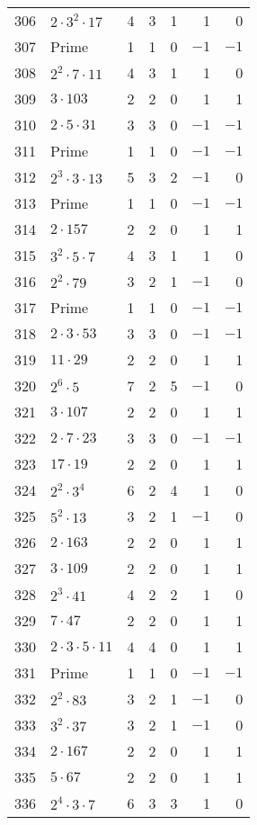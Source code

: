 \documentclass[12pt]{article}
\begin{document}
\begin{tabular}{|r|l|r|r|r|r|r|}
306 & $2 \cdot 3^2 \cdot 17$ & 4 & 3 & 1 & 1 & 0 \\
307 & Prime & 1 & 1 & 0 & $-1$ & $-1$ \\
308 & $2^2 \cdot 7 \cdot 11$ & 4 & 3 & 1 & 1 & 0 \\
309 & $3 \cdot 103$ & 2 & 2 & 0 & 1 & 1 \\
310 & $2 \cdot 5 \cdot 31$ & 3 & 3 & 0 & $-1$ & $-1$ \\
311 & Prime & 1 & 1 & 0 & $-1$ & $-1$ \\
312 & $2^3 \cdot 3 \cdot 13$ & 5 & 3 & 2 & $-1$ & 0 \\
313 & Prime & 1 & 1 & 0 & $-1$ & $-1$ \\
314 & $2 \cdot 157$ & 2 & 2 & 0 & 1 & 1 \\
315 & $3^2 \cdot 5 \cdot 7$ & 4 & 3 & 1 & 1 & 0 \\
316 & $2^2 \cdot 79$ & 3 & 2 & 1 & $-1$ & 0 \\
317 & Prime & 1 & 1 & 0 & $-1$ & $-1$ \\
318 & $2 \cdot 3 \cdot 53$ & 3 & 3 & 0 & $-1$ & $-1$ \\
319 & $11 \cdot 29$ & 2 & 2 & 0 & 1 & 1 \\
320 & $2^6 \cdot 5$ & 7 & 2 & 5 & $-1$ & 0 \\
321 & $3 \cdot 107$ & 2 & 2 & 0 & 1 & 1 \\
322 & $2 \cdot 7 \cdot 23$ & 3 & 3 & 0 & $-1$ & $-1$ \\
323 & $17 \cdot 19$ & 2 & 2 & 0 & 1 & 1 \\
324 & $2^2 \cdot 3^4$ & 6 & 2 & 4 & 1 & 0 \\
325 & $5^2 \cdot 13$ & 3 & 2 & 1 & $-1$ & 0 \\
326 & $2 \cdot 163$ & 2 & 2 & 0 & 1 & 1 \\
327 & $3 \cdot 109$ & 2 & 2 & 0 & 1 & 1 \\
328 & $2^3 \cdot 41$ & 4 & 2 & 2 & 1 & 0 \\
329 & $7 \cdot 47$ & 2 & 2 & 0 & 1 & 1 \\
330 & $2 \cdot 3 \cdot 5 \cdot 11$ & 4 & 4 & 0 & 1 & 1 \\
331 & Prime & 1 & 1 & 0 & $-1$ & $-1$ \\
332 & $2^2 \cdot 83$ & 3 & 2 & 1 & $-1$ & 0 \\
333 & $3^2 \cdot 37$ & 3 & 2 & 1 & $-1$ & 0 \\
334 & $2 \cdot 167$ & 2 & 2 & 0 & 1 & 1 \\
335 & $5 \cdot 67$ & 2 & 2 & 0 & 1 & 1 \\
336 & $2^4 \cdot 3 \cdot 7$ & 6 & 3 & 3 & 1 & 0 \\

\end{tabular}
\end{document}
